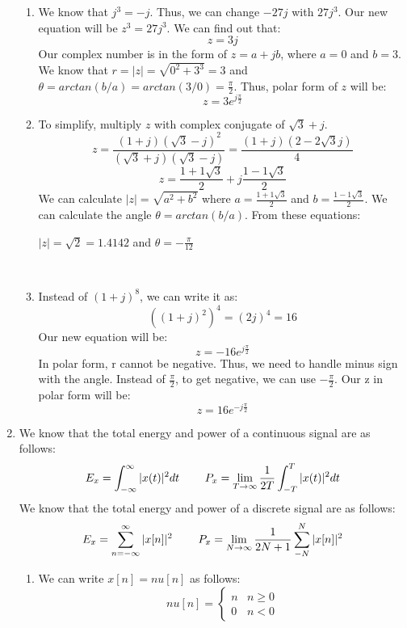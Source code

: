 \documentclass[10pt,a4paper, margin=1in]{article}
\begin{document}
\begin{enumerate}
\begin{enumerate}
    \item We know that $j^3 = -j$. Thus, we can change $-27j$ with $27j^3$. Our new equation will be $z^3 = 27j^3$. We can find out that:
    \[z = 3j\]
    Our complex number is in the form of $z = a + jb$, where $a = 0$ and $b = 3$. We know that $r = |z| = \sqrt{0^2 + 3^3} = 3$ and $\theta = arctan(b/a) = arctan(3/0) = \frac{\pi}{2}$. Thus, polar form of $z$ will be:
    \[z = 3e^{j\frac{\pi}{2}}\]
    \item To simplify, multiply $z$ with complex conjugate of $\sqrt{3} + j$.
    \[z = \frac{(1+j)(\sqrt{3}-j)^2}{(\sqrt{3}+j)(\sqrt{3}-j)} = \frac{(1+j)(2-2\sqrt{3}j)}{4}\]
    \[z = \frac{1+1\sqrt{3}}{2} +  j\frac{1-1\sqrt{3}}{2}\]
    We can calculate $|z| = \sqrt{a^2 + b^2}$ where $a = \frac{1 + 1\sqrt{3}}{2}$ and $b = \frac{1 - 1\sqrt{3}}{2}$. We can calculate the angle $\theta = arctan(b/a)$. From these equations:
    \begin{center}
        $|z| = \sqrt{2} = 1.4142$ and $\theta = -\frac{\pi}{12}$
    \end{center}\\
    \item Instead of $(1+j)^8$, we can write it as:
    \[((1+j)^2)^4 = (2j)^4 = 16\]
    Our new equation will be:
    \[z = -16e^{j\frac{\pi}{2}}\]
    In polar form, r cannot be negative. Thus, we need to handle minus sign with the angle. Instead of $\frac{\pi}{2}$, to get negative, we can use $-\frac{\pi}{2}$. Our z in polar form will be:
    \[z = 16e^{-j\frac{\pi}{2}}\]
    \end{enumerate}\vspace{5mm}
\item We know that the total energy and power of a continuous signal are as follows:
    \[E_x = \int_{-\infty}^{\infty} |x(t)|^2 dt \hspace{8mm} P_x = \lim_{T\to\infty} \frac{1}{2T} \int_{-T}^{T}|x(t)|^2 dt\]
    We know that the total energy and power of a discrete signal are as follows:
    \[E_x = \sum_{n=-\infty}^{\infty} |x[n]|^2 \hspace{8mm} P_x = \lim_{N\to\infty} \frac{1}{2N+1}\sum_{-N}^{N} |x[n]|^2\]
    \begin{enumerate}
    \item We can write $x[n] = nu[n]$ as follows:
    \[nu[n] =  \begin{cases} 
      n & n \geq 0 \\
      0 & n < 0 
   \end{cases}
\]
\end{enumerate}
\end{enumerate}
\end{document}
